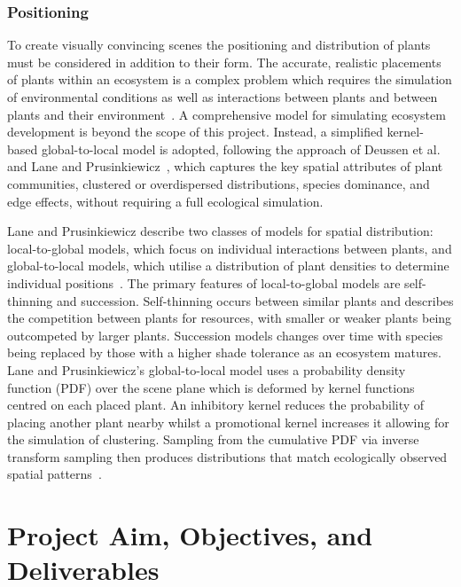 \subsubsection{Positioning}

To create visually convincing scenes the positioning and distribution of plants must be considered in
addition to their form. The accurate, realistic placements of plants within an ecosystem is a complex problem
which requires the simulation of environmental conditions as well as interactions between plants and between
plants and their environment~\cite{chngRealisticPlacementPlants2011}. A comprehensive model for simulating
ecosystem development is beyond the scope of this project. Instead, a simplified kernel-based global-to-local
model is adopted, following the approach of Deussen et al.~\cite{deussenRealisticModelingRendering1998} and
Lane and Prusinkiewicz~\cite{laneGeneratingSpatialDistributions2002}, which captures the key spatial
attributes of plant communities, clustered or overdispersed distributions, species dominance, and edge
effects, without requiring a full ecological simulation.

\medskip
Lane and Prusinkiewicz describe two classes of models for spatial distribution: local-to-global models, which
focus on individual interactions between plants, and global-to-local models, which utilise a distribution of
plant densities to determine individual positions~\cite{laneGeneratingSpatialDistributions2002}. The primary
features of local-to-global models are self-thinning and succession. Self-thinning occurs between similar
plants and describes the competition between plants for resources, with smaller or weaker plants being
outcompeted by larger plants. Succession models changes over time with species being replaced by those with a
higher shade tolerance as an ecosystem matures. Lane and Prusinkiewicz's global-to-local model uses a
probability density function (PDF) over the scene plane which is deformed by kernel functions centred on each
placed plant. An inhibitory kernel reduces the probability of placing another plant nearby whilst a
promotional kernel increases it allowing for the simulation of clustering. Sampling from the cumulative PDF
via inverse transform sampling then produces distributions that match ecologically observed spatial
patterns~\cite{laneGeneratingSpatialDistributions2002}.

\section{Project Aim, Objectives, and Deliverables}

